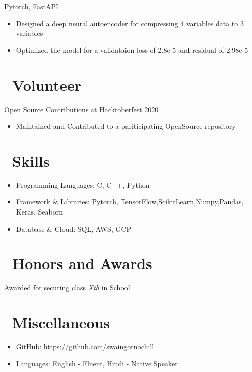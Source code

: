 \documentclass{resume}
\begin{document}
Pytorch, FastAPI
\begin{itemize}
  \item Designed a deep neural autoencoder for compressing 4 variables data to 3 variables
  \item Optimized the model for a validataion loss of 2.8e-5 and residual of 2.98e-5
\end{itemize}

\section{\faGraduationCap\ Volunteer}
Open Source Contributions at Hacktoberfest 2020
\begin{itemize}
\item Maintained and Contributed to a pariticipating OpenSource repository  
\end{itemize}



\section{\faCogs\ Skills}
\begin{itemize}[parsep=0.5ex]
  \item Programming Languages: C, C++, Python
  \item Framework & Libraries: Pytorch, TensorFlow,ScikitLearn,Numpy,Pandas, Keras, Seaborn
  \item Database & Cloud: SQL, AWS, GCP
\end{itemize}

\section{\faHeartO\ Honors and Awards}
Awarded for securing class \textit{Xth} in School

\section{\faInfo\ Miscellaneous}
\begin{itemize}[parsep=0.5ex] 
  \item GitHub: https://github.com/swaingotnochill
  \item Languages: English - Fluent, Hindi - Native Speaker
\end{itemize}

%
%
\end{document}
